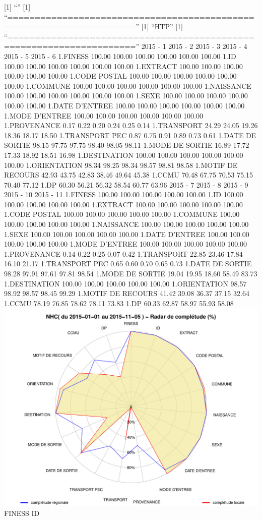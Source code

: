 \documentclass[]{article}
\begin{document}
{[}1{]} ``'' {[}1{]}
``=====================================================================''
{[}1{]} ``HTP'' {[}1{]}
``=====================================================================''
2015 - 1 2015 - 2 2015 - 3 2015 - 4 2015 - 5 2015 - 6 1.FINESS 100.00
100.00 100.00 100.00 100.00 100.00 1.ID 100.00 100.00 100.00 100.00
100.00 100.00 1.EXTRACT 100.00 100.00 100.00 100.00 100.00 100.00 1.CODE
POSTAL 100.00 100.00 100.00 100.00 100.00 100.00 1.COMMUNE 100.00 100.00
100.00 100.00 100.00 100.00 1.NAISSANCE 100.00 100.00 100.00 100.00
100.00 100.00 1.SEXE 100.00 100.00 100.00 100.00 100.00 100.00 1.DATE
D'ENTREE 100.00 100.00 100.00 100.00 100.00 100.00 1.MODE D'ENTREE
100.00 100.00 100.00 100.00 100.00 100.00 1.PROVENANCE 0.17 0.22 0.20
0.24 0.25 0.14 1.TRANSPORT 24.29 24.05 19.26 18.36 18.17 18.50
1.TRANSPORT PEC 0.87 0.75 0.91 0.89 0.73 0.61 1.DATE DE SORTIE 98.15
97.75 97.75 98.40 98.05 98.11 1.MODE DE SORTIE 16.89 17.72 17.33 18.92
18.51 16.98 1.DESTINATION 100.00 100.00 100.00 100.00 100.00 100.00
1.ORIENTATION 98.34 98.25 98.34 98.57 98.81 98.58 1.MOTIF DE RECOURS
42.93 43.75 42.83 38.46 49.64 45.38 1.CCMU 70.48 67.75 70.53 75.15 70.40
77.12 1.DP 60.30 56.21 56.32 58.54 60.77 63.96 2015 - 7 2015 - 8 2015 -
9 2015 - 10 2015 - 11 1.FINESS 100.00 100.00 100.00 100.00 100.00 1.ID
100.00 100.00 100.00 100.00 100.00 1.EXTRACT 100.00 100.00 100.00 100.00
100.00 1.CODE POSTAL 100.00 100.00 100.00 100.00 100.00 1.COMMUNE 100.00
100.00 100.00 100.00 100.00 1.NAISSANCE 100.00 100.00 100.00 100.00
100.00 1.SEXE 100.00 100.00 100.00 100.00 100.00 1.DATE D'ENTREE 100.00
100.00 100.00 100.00 100.00 1.MODE D'ENTREE 100.00 100.00 100.00 100.00
100.00 1.PROVENANCE 0.14 0.22 0.25 0.07 0.42 1.TRANSPORT 22.85 23.46
17.84 16.10 21.17 1.TRANSPORT PEC 0.65 0.60 0.70 0.65 0.73 1.DATE DE
SORTIE 98.28 97.91 97.61 97.81 98.54 1.MODE DE SORTIE 19.04 19.95 18.60
58.49 83.73 1.DESTINATION 100.00 100.00 100.00 100.00 100.00
1.ORIENTATION 98.57 98.92 98.57 98.45 99.29 1.MOTIF DE RECOURS 41.42
39.08 36.37 37.15 32.64 1.CCMU 78.19 76.85 78.62 78.11 73.83 1.DP 60.33
62.87 58.97 55.93 58.08
\includegraphics{completude_files/figure-latex/finess-16.pdf} FINESS ID
\end{document}
